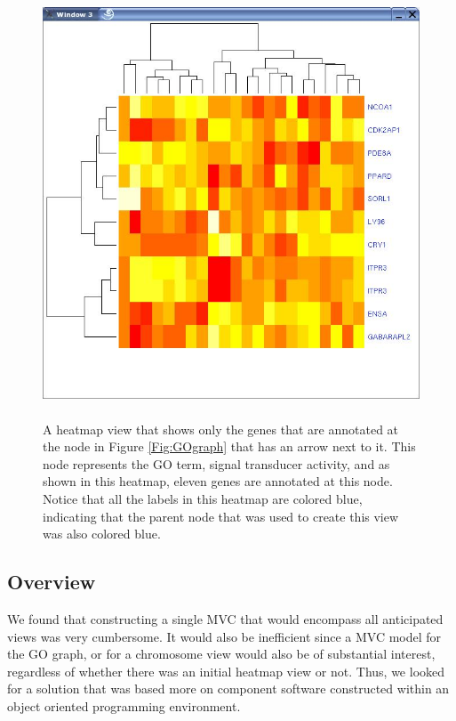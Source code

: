 \documentclass[11pt]{article}
\begin{document}
\begin{figure}[ht]
  \begin{center}
    \includegraphics[height=5in, width=5in]{heatmapsub.jpg}
    \caption{ A heatmap view that shows only the genes that are annotated at
      the node in Figure \ref{Fig:GOgraph} that has an arrow next to it.  This
      node represents the GO term, signal transducer activity, and as shown in
      this heatmap, eleven genes are annotated at this node.  Notice that all
      the labels in this heatmap are colored blue, indicating that the parent
      node that was used to create this view was also colored blue.  
     }
    \label{Fig:heatmapsub}
  \end{center}
\end{figure}


\subsection*{Overview}

We found that constructing a single MVC that would encompass all
anticipated views was very cumbersome. It would also be inefficient
since a MVC model for the GO graph, or for a chromosome view would
also be of substantial interest, regardless of whether there was an
initial heatmap view or not. Thus, we looked for a solution that was
based more on component software constructed within an object oriented
programming environment.
\end{document}
